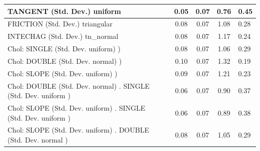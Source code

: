 \begin{table}
\begin{center}
\begin{tabular}{|l|l|c|c|c|l|}
			\hline
			TANGENT (Std. Dev.) uniform &  & 0.05 & 0.07 & 0.76 & 0.45 \\
			\hline
			FRICTION (Std. Dev.) triangular &  & 0.08 & 0.07 & 1.08 & 0.28 \\
			\hline
			INTECHAG (Std. Dev.) tn_normal &  & 0.08 & 0.07 & 1.17 & 0.24 \\
			\hline
			 Chol: SINGLE (Std. Dev. uniform) ) &  & 0.08 & 0.07 & 1.06 & 0.29 \\
			\hline
			 Chol: DOUBLE (Std. Dev. normal) ) &  & 0.10 & 0.07 & 1.32 & 0.19 \\
			\hline
			 Chol: SLOPE (Std. Dev. uniform) ) &  & 0.09 & 0.07 & 1.21 & 0.23 \\
			\hline
			 Chol: DOUBLE (Std. Dev. normal) . SINGLE (Std. Dev.   uniform ) &  & 0.06 & 0.07 & 0.90 & 0.37 \\
			\hline
			 Chol: SLOPE (Std. Dev. uniform) . SINGLE (Std. Dev.   uniform ) &  & 0.06 & 0.07 & 0.89 & 0.38 \\
			\hline
			 Chol: SLOPE (Std. Dev. uniform) . DOUBLE (Std. Dev.   normal ) &  & 0.08 & 0.07 & 1.05 & 0.29 \\
			\hline
		\end{tabular}
	\end{center}
\end{table}